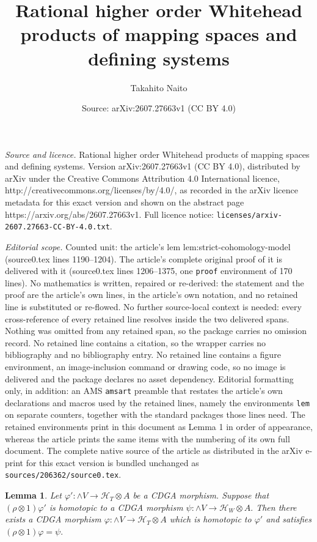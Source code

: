 \documentclass[10pt,a4paper]{amsart}
\title{Rational higher order Whitehead products of mapping spaces and defining systems}
\author{Takahito Naito}
\date{Source: arXiv:2607.27663v1 (CC BY 4.0)}
\newtheorem{lem}{Lemma}
\begin{document}
\maketitle

\noindent\emph{Source and licence.} Rational higher order Whitehead products of mapping spaces and defining systems. Version arXiv:2607.27663v1 (CC BY 4.0), distributed by arXiv under the Creative Commons Attribution 4.0 International licence, http://creativecommons.org/licenses/by/4.0/, as recorded in the arXiv licence metadata for this exact version and shown on the abstract page https://arxiv.org/abs/2607.27663v1. Full licence notice: \texttt{licenses/arxiv-2607.27663-CC-BY-4.0.txt}.\par\smallskip

\noindent\textit{Editorial scope.} Counted unit: the article's lem lem:strict-cohomology-model (source0.tex lines 1190--1204). The article's complete original proof of it is delivered with it (source0.tex lines 1206--1375, one \texttt{proof} environment of 170 lines). No mathematics is written, repaired or re-derived: the statement and the proof are the article's own lines, in the article's own notation, and no retained line is substituted or re-flowed.  No further source-local context is needed: every cross-reference of every retained line resolves inside the two delivered spans.  Nothing was omitted from any retained span, so the package carries no omission record.  No retained line contains a citation, so the wrapper carries no bibliography and no bibliography entry.  No retained line contains a figure environment, an image-inclusion command or drawing code, so no image is delivered and the package declares no asset dependency.  Editorial formatting only, in addition: an AMS \texttt{amsart} preamble that restates the article's own declarations and macros used by the retained lines, namely the environments \texttt{lem} on separate counters, together with the standard packages those lines need.  The retained environments print in this document as Lemma 1 in order of appearance, whereas the article prints the same items with the numbering of its own full document.  The complete native source of the article as distributed in the arXiv e-print for this exact version is bundled unchanged as \texttt{sources/206362/source0.tex}.
\begin{lem}\label{lem:strict-cohomology-model}
Let $\varphi':\wedge V\to \mathcal H_T\otimes A$ be a CDGA morphism.
Suppose that $(\rho\otimes 1)\varphi'$ is homotopic to a CDGA morphism
$
\psi:\wedge V\to \mathcal H_W\otimes A.
$
Then there exists a CDGA morphism
$
\varphi:\wedge V\to \mathcal H_T\otimes A
$
which is homotopic to $\varphi'$ and satisfies
$
(\rho\otimes 1)\varphi=\psi.
$
\end{lem}
\end{document}
